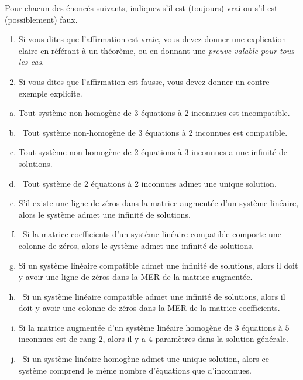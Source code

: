 \begin{prob}
\begin{enumerate}[a)]
\end{enumerate}

\end{prob} \begin{prob} \label{prob13.4}   Pour chacun des énoncés suivants, indiquez s'il est (toujours) vrai
ou s'il est (possiblement) faux.    
   \smallskip    
\begin{enumerate}[$\bullet$]
\item Si vous dites que l'affirmation est vraie, vous devez donner une explication claire en r\'ef\'erant \`a un théorème, ou en donnant une {\it preuve valable pour tous les cas}.
\item Si vous dites que l'affirmation est fausse, vous devez donner un contre-exemple explicite.  
\end{enumerate}
\medskip
\begin{enumerate}[a)]
\item Tout système non-homogène de 3 équations à 2 inconnues est incompatible.
\medskip
 
\item\sov~Tout système non-homogène de 3 équations à 2 inconnues est compatible.

\medskip
 
\item Tout système non-homogène de 2 équations à 3 inconnues a une infinité de solutions.
\medskip
 
\item\sov~Tout système de 2 équations à 2 inconnues admet une unique solution.
\medskip
 
\item S'il existe une ligne de zéros dans la matrice augmentée d'un système linéaire, alors le système admet une infinité de solutions.
\medskip
 
\item\sov~Si la matrice coefficients d'un système linéaire compatible comporte une colonne de zéros, alors le système admet une infinité de solutions.
\medskip
 
\item Si un système linéaire compatible admet une infinité de solutions, alors il doit y avoir une ligne de zéros dans la MER de la matrice augmentée.
\medskip
 
\item\sov~Si un système linéaire compatible admet une infinité de solutions, alors il doit y avoir une colonne de zéros dans la MER de la matrice coefficients.
\medskip
 
\item Si la matrice augmentée d'un système linéaire homogène de $3$ équations à $5$ inconnues est de rang $2$, alors il y a $4$ paramètres dans la solution générale.
\medskip
 
\item\sov~Si un système linéaire homogène admet une unique solution, alors ce système comprend le même nombre d'équations que d'inconnues.
\medskip
 
\end{enumerate}

\end{prob}

